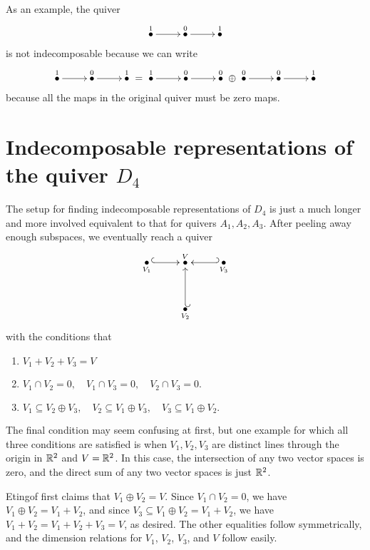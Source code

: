 \documentclass[oneside]{scrbook}
\begin{document}
As an example, the quiver
\[\xymatrix{
\overset{1}{\bullet}
\ar[r] & \overset{0}{\bullet}\ar[r]  &
\overset{1}{\bullet} 
}\]
is not indecomposable because we can write
\[\xymatrix{\overset{1}{\bullet}\ar[r] & \overset{0}{\bullet}\ar[r] & \overset{1}{\bullet}}=\xymatrix{\overset{1}{\bullet}\ar[r] & \overset{0}{\bullet}\ar[r] & \overset{0}{\bullet}}\oplus\xymatrix{\overset{0}{\bullet}\ar[r] & \overset{0}{\bullet}\ar[r] & \overset{1}{\bullet}}\]
because all the maps in the original quiver must be zero maps. 

\section{Indecomposable representations of the quiver $D_4$}
The setup for finding indecomposable representations of $D_4$ is just a much longer and more involved equivalent to that for quivers $A_1,A_2,A_3$. After peeling away enough subspaces, we eventually reach a quiver
\[\xymatrix{\underset{V_1}{\bullet}\ar@{^{(}->}[r] & \overset{V}{\bullet} & \ar@{_{(}->}[l] \underset{V_3}{\bullet}\\
& \underset{V_2}{\bullet}\ar@{_{(}->}[u] &
}\]
with the conditions that
\begin{enumerate}[(1)]
    \item $V_1+V_2+V_3=V$
    \item $V_1\cap V_2=0,\quad V_1\cap V_3=0,\quad V_2\cap V_3=0.$
    \item $V_1\subseteq V_2\oplus V_3,\quad  V_2\subseteq V_1\oplus V_3,\quad V_3\subseteq V_1\oplus V_2.$
\end{enumerate}
The final condition may seem confusing at first, but one example for which all three conditions are satisfied is when $V_1,V_2,V_3$ are distinct lines through the origin in $\mathbb R^2$ and $V=\mathbb R^2$. In this case, the intersection of any two vector spaces is zero, and the direct sum of any two vector spaces is just $\mathbb R^2$. 

Etingof first claims that $V_1\oplus V_2=V$. Since $V_1\cap V_2=0$, we have $V_1\oplus V_2=V_1+V_2$, and since $V_3\subseteq V_1\oplus V_2=V_1+ V_2$, we have $V_1+V_2=V_1+V_2+V_3=V$, as desired. The other equalities follow symmetrically, and the dimension relations for $V_1$, $V_2$, $V_3$, and $V$ follow easily. 
\end{document}
